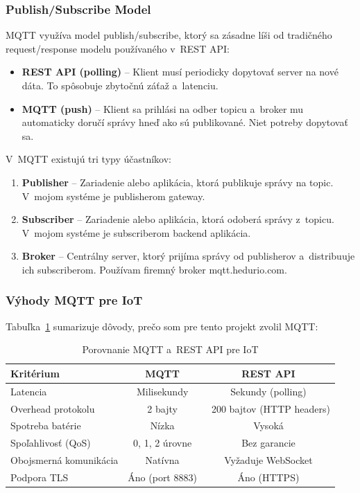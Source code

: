 \subsubsection{Publish/Subscribe Model}

MQTT využíva model publish/subscribe, ktorý sa zásadne líši od tradičného request/response modelu používaného v~REST API:

\begin{itemize}
    \item \textbf{REST API (polling)} -- Klient musí periodicky dopytovať server na nové dáta. To spôsobuje zbytočnú záťaž a~latenciu.

    \item \textbf{MQTT (push)} -- Klient sa prihlási na odber topicu a~broker mu automaticky doručí správy hneď ako sú publikované. Niet potreby dopytovať sa.
\end{itemize}

V~MQTT existujú tri typy účastníkov:

\begin{enumerate}
    \item \textbf{Publisher} -- Zariadenie alebo aplikácia, ktorá publikuje správy na topic. V~mojom systéme je publisherom gateway.

    \item \textbf{Subscriber} -- Zariadenie alebo aplikácia, ktorá odoberá správy z~topicu. V~mojom systéme je subscriberom backend aplikácia.

    \item \textbf{Broker} -- Centrálny server, ktorý prijíma správy od publisherov a~distribuuje ich subscriberom. Používam firemný broker mqtt.hedurio.com.
\end{enumerate}

\subsubsection{Výhody MQTT pre IoT}

Tabuľka~\ref{tab:mqtt-vs-rest} sumarizuje dôvody, prečo som pre tento projekt zvolil MQTT:

\begin{table}[htbp]
    \centering
    \begin{tabular}{|l|c|c|}
        \hline
        \textbf{Kritérium} & \textbf{MQTT} & \textbf{REST API} \\
        \hline
        Latencia & Milisekundy & Sekundy (polling) \\
        Overhead protokolu & 2 bajty & ~200 bajtov (HTTP headers) \\
        Spotreba batérie & Nízka & Vysoká \\
        Spoľahlivosť (QoS) & 0, 1, 2 úrovne & Bez garancie \\
        Obojsmerná komunikácia & Natívna & Vyžaduje WebSocket \\
        Podpora TLS & Áno (port 8883) & Áno (HTTPS) \\
        \hline
    \end{tabular}
    \caption{Porovnanie MQTT a~REST API pre IoT}
    \label{tab:mqtt-vs-rest}
\end{table}

